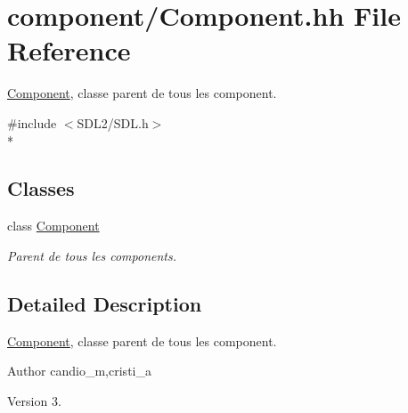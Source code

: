 \hypertarget{_component_8hh}{}\section{component/\+Component.hh File Reference}
\label{_component_8hh}


\hyperlink{class_component}{Component}, classe parent de tous les component.  


{\ttfamily \#include $<$S\+D\+L2/\+S\+D\+L.\+h$>$}\\*
\subsection*{Classes}
\begin{DoxyCompactItemize}
\item 
class \hyperlink{class_component}{Component}
\begin{DoxyCompactList}\small\item\em Parent de tous les components. \end{DoxyCompactList}\end{DoxyCompactItemize}


\subsection{Detailed Description}
\hyperlink{class_component}{Component}, classe parent de tous les component. 

\begin{DoxyAuthor}{Author}
candio\+\_\+m,cristi\+\_\+a 
\end{DoxyAuthor}
\begin{DoxyVersion}{Version}
3. 
\end{DoxyVersion}
